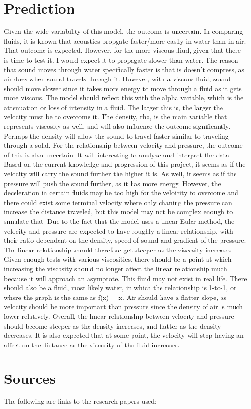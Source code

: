\documentclass{article}
\begin{document}
\newpage

\section{Prediction}

Given the wide variability of this model, the outcome is uncertain. In comparing fluids, it is known
that acoustics propgate faster/more easily in water than in air. That outcome is expected. However, for the
more viscous fliud, given that there is time to test it, I would expect it to propagate slower than water.
The reason that sound moves through water specifically faster is that is doesn't compress, as air does
when sound travels through it. However, with a viscous fluid, sound should move slower since it takes
more energy to move through a fluid as it gets more viscous. The model should reflect this with the 
alpha variable, which is the attenuation or loss of intensity in a fluid. The larger this is, the
larger the velocity must be to overcome it. The density, rho, is the main variable that represents
viscosity as well, and will also influence the outcome significantly. Perhaps the density will allow
the sound to travel faster similar to traveling through a solid. 
For the relationship between velocity and pressure, the outcome of this is also uncertain. It will
interesting to analyze and interpret the data. Based on the current knowledge and progression of this
project, it seems as if the velocity will carry the sound further the higher it is. As well, it 
seems as if the pressure will push the sound further, as it has more energy. However, the deceleration in
certain fluids may be too high for the veloicity to overcome and there could exist some terminal velocity
where only chaning the pressure can increase the distance traveled, but this model may not be complex enough
to simulate that. 
Due to the fact that the model uses a linear Euler method, the velocity and pressure are expected to have
roughly a linear relationship, with their ratio dependent on the density, speed of sound and gradient
of the pressure. The linear relationship should therefore get steeper as the viscosity increases. 
Given enough tests with various viscosities, there should be a point at which increasing the viscosity
should no longer affect the linear relationship much because it will approach an asymptote. This fluid
may not exist in real life. There should also be a fluid, most likely water, in which the relationship
is 1-to-1, or where the graph is the same as f(x) = x. Air should have a flatter slope, as velocity
should be more important than pressure since the density of air is much lower relatively. 
Overall, the linear relationship between velocity and pressure should become steeper as the density
increases, and flatter as the density decreases. It is also expected that at some point, the velocity
will stop having an affect on the distance as the viscosity of the fluid increases.

\section{Sources}
The following are links to the research papers used:
\end{document}
